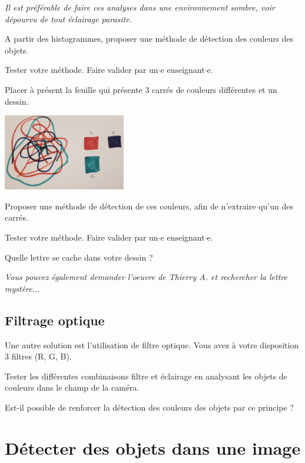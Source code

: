 \documentclass[a4paper,11pt,titlepage]{article} %
\begin{document}
\textit{Il est préférable de faire ces analyses dans une environnement sombre, voir dépourvu de tout éclairage parasite.}

\Quest A partir des histogrammes, proposer une méthode de détection des couleurs des objets.

\Manip Tester votre méthode. Faire valider par un$\cdot$e enseignant$\cdot$e.

\medskip

\Manip Placer à présent la feuille qui présente 3 carrés de couleurs différentes et un dessin.

\begin{center}
	\includegraphics[width=0.4\textwidth]{images/dessin.jpg}
\end{center}

\Quest Proposer une méthode de détection de ces couleurs, afin de n'extraire qu'un des carrés.

\Manip Tester votre méthode. Faire valider par un$\cdot$e enseignant$\cdot$e.

\Quest Quelle lettre se cache dans votre dessin ? 

\textit{Vous pouvez également demander l'oeuvre de Thierry A. et rechercher la lettre mystère...}

\subsection{Filtrage optique}

Une autre solution est l'utilisation de filtre optique. Vous avez à votre disposition 3 filtres (R, G, B).

\Manip Tester les différentes combinaisons filtre et éclairage en analysant les objets de couleurs dans le champ de la caméra.

\Quest Est-il possible de renforcer la détection des couleurs des objets par ce principe ?

\newpage
\section{Détecter des objets dans une image}
\end{document}
